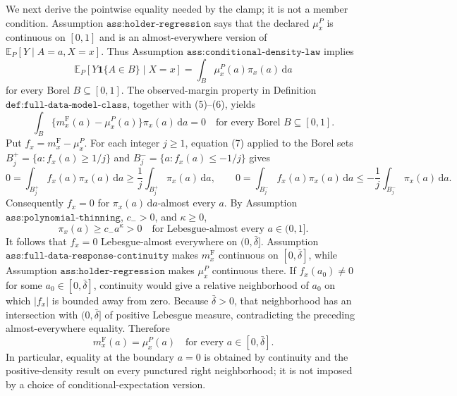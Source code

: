 We next derive the pointwise equality needed by the clamp; it is not a member condition.  Assumption \(\texttt{ass:holder-regression}\) says that the declared \(\mu_x^P\) is continuous on \([0,1]\) and is an almost-everywhere version of \(\mathbb E_P[Y\mid A=a,X=x]\).  Thus Assumption \(\texttt{ass:conditional-density-law}\) implies
\[
 \mathbb E_P[Y\mathbf 1\{A\in B\}\mid X=x]
 =\int_B\mu_x^P(a)\pi_x(a)\,\mathrm da
 \tag{6}
\]
for every Borel \(B\subseteq[0,1]\).  The observed-margin property in Definition \(\texttt{def:full-data-model-class}\), together with (5)--(6), yields
\[
 \int_B\{m_x^{\mathrm F}(a)-\mu_x^P(a)\}\pi_x(a)\,\mathrm da=0
 \quad\text{for every Borel }B\subseteq[0,1].
 \tag{7}
\]
Put \(f_x=m_x^{\mathrm F}-\mu_x^P\).  For each integer \(j\geq1\), equation (7) applied to the Borel sets \(B_j^+=\{a:f_x(a)\geq1/j\}\) and \(B_j^-=\{a:f_x(a)\leq-1/j\}\) gives
\[
 0=\int_{B_j^+}f_x(a)\pi_x(a)\,\mathrm da
 \geq \frac1j\int_{B_j^+}\pi_x(a)\,\mathrm da,
 \qquad
 0=\int_{B_j^-}f_x(a)\pi_x(a)\,\mathrm da
 \leq-\frac1j\int_{B_j^-}\pi_x(a)\,\mathrm da.
 \tag{8}
\]
Consequently \(f_x=0\) for \(\pi_x(a)\,\mathrm da\)-almost every \(a\).  By Assumption \(\texttt{ass:polynomial-thinning}\), \(c_->0\), and \(\kappa\geq0\),
\[
 \pi_x(a)\geq c_-a^\kappa>0
 \quad\text{for Lebesgue-almost every }a\in(0,1].
 \tag{9}
\]
It follows that \(f_x=0\) Lebesgue-almost everywhere on \((0,\bar\delta]\).  Assumption \(\texttt{ass:full-data-response-continuity}\) makes \(m_x^{\mathrm F}\) continuous on \([0,\bar\delta]\), while Assumption \(\texttt{ass:holder-regression}\) makes \(\mu_x^P\) continuous there.  If \(f_x(a_0)\neq0\) for some \(a_0\in[0,\bar\delta]\), continuity would give a relative neighborhood of \(a_0\) on which \(|f_x|\) is bounded away from zero.  Because \(\bar\delta>0\), that neighborhood has an intersection with \((0,\bar\delta]\) of positive Lebesgue measure, contradicting the preceding almost-everywhere equality.  Therefore
\[
 m_x^{\mathrm F}(a)=\mu_x^P(a)
 \quad\text{for every }a\in[0,\bar\delta].
 \tag{10}
\]
In particular, equality at the boundary \(a=0\) is obtained by continuity and the positive-density result on every punctured right neighborhood; it is not imposed by a choice of conditional-expectation version.

